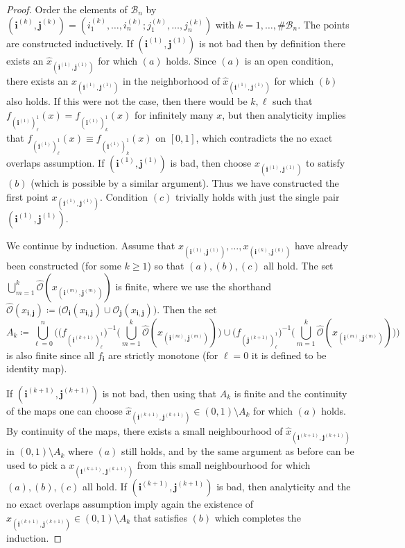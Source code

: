 \documentclass[12pt,]{article}
\theoremstyle{definition}
\theoremstyle{remark}
\newcommand{\0}{\mathbf{0}}
\newcommand{\bi}{\mathbf{i}}
\newcommand{\bj}{\mathbf{j}}
\begin{document}
\begin{proof}
Order the elements of $\mathcal{B}_n$ by $(\bi^{(k)},\bj^{(k)})=(i_1^{(k)},\ldots,
i_n^{(k)};j_1^{(k)},\ldots,j_n^{(k)})$ with $k=1,\ldots,\#\mathcal{B}_n$. The points are constructed
inductively. If $(\bi^{(1)},\bj^{(1)})$ is not bad then by definition there exists an $\hat
x_{(\bi^{(1)},\bj^{(1)})}$ for which $(a)$ holds. Since $(a)$ is an open condition, there exists an
$x_{(\bi^{(1)},\bj^{(1)})}$ in the neighborhood of $\hat x_{(\bi^{(1)},\bj^{(1)})}$ for which $(b)$
also holds. If this were not the case, then there would be $k,\ell$ such that
$f_{(\bi^{(1)})_{\ell}^1}(x)=f_{(\bi^{(1)})_{k}^1}(x)$ for infinitely many $x$, but then analyticity
implies that $f_{(\bi^{(1)})_{\ell}^1}(x)\equiv f_{(\bi^{(1)})_{k}^1}(x)$ on $[0,1]$, which contradicts the no
exact overlaps assumption. If $(\bi^{(1)},\bj^{(1)})$ is bad, then choose
$x_{(\bi^{(1)},\bj^{(1)})}$ to satisfy $(b)$ (which is possible by a similar argument). Thus we have
constructed the first point $x_{(\bi^{(1)},\bj^{(1)})}$. Condition $(c)$ trivially holds with just
the single pair $(\bi^{(1)},\bj^{(1)})$. 

We continue by induction. Assume that $x_{(\bi^{(1)},\bj^{(1)})},\ldots,x_{(\bi^{(k)},\bj^{(k)})}$
have already been constructed (for some $k\geq 1$) so that $(a),(b),(c)$ all hold. The set
$\bigcup_{m=1}^k \widehat{\mathcal{O}}(x_{(\bi^{(m)},\bj^{(m)})})$ is finite, where we use the
shorthand  $\widehat{\mathcal{O}}(x_{\bi,\bj})\coloneqq\big(\mathcal{O}_{\bi}(x_{\bi,\bj})\cup
\mathcal{O}_{\bj}(x_{\bi,\bj})\big)$. Then the set
\begin{equation*}
A_k\coloneqq \bigcup_{\ell=0}^n \bigg( \big(f_{(\bi^{(k+1)})_{\ell}^1}\big)^{-1} \Big(
\bigcup_{m=1}^k \widehat{\mathcal{O}}(x_{(\bi^{(m)},\bj^{(m)})}) \Big) \cup
\big(f_{(\bj^{(k+1)})_{\ell}^1}\big)^{-1} \Big( \bigcup_{m=1}^k
\widehat{\mathcal{O}}(x_{(\bi^{(m)},\bj^{(m)})}) \Big) \bigg)
\end{equation*}
is also finite since all $f_{\bi}$ are strictly monotone (for $\ell=0$ it is defined to be identity map). 

If $(\bi^{(k+1)},\bj^{(k+1)})$ is not
bad, then using that $A_k$ is finite and the continuity of the maps one can choose $\hat x_{(\bi^{(k+1)},\bj^{(k+1)})}\in(0,1)\setminus A_k$ for which $(a)$
holds. By continuity of the maps, there exists a small neighbourhood of $\hat
x_{(\bi^{(k+1)},\bj^{(k+1)})}$ in $(0,1)\setminus A_k$ where $(a)$ still holds, and by the same
argument as before can be used to pick a $x_{(\bi^{(k+1)},\bj^{(k+1)})}$ from this small
neighbourhood for which $(a),(b),(c)$ all hold. If $(\bi^{(k+1)},\bj^{(k+1)})$ is bad, then
analyticity and the no exact overlaps assumption imply again the existence of
$x_{(\bi^{(k+1)},\bj^{(k+1)})}\in(0,1)\setminus A_k$ that satisfies $(b)$ which completes the
induction. 
\end{proof}
\end{document}
